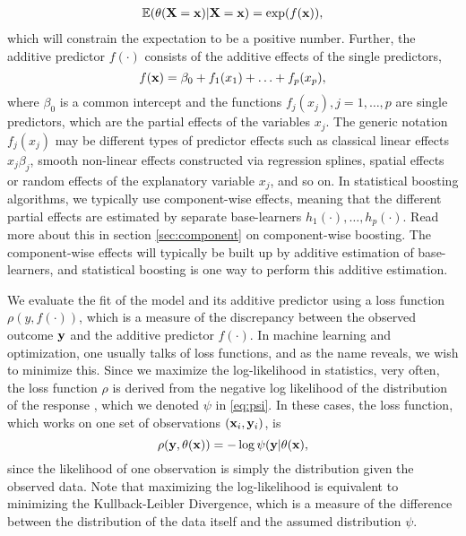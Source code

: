 \begin{align}
    \mathbb{E}(\theta(\mathbf{X}=\mathbf{x})|\mathbf{X}=\mathbf{x})=\exp(f(\mathbf{x})),
\end{align}
which will constrain the expectation to be a positive number. Further, the additive predictor $f(\cdot)$ consists of the additive effects of the single predictors,
\begin{equation}\label{eq:gam}
    f(\mathbf{x})=\beta_0+f_1(x_1)+\ldots+f_p(x_p),
\end{equation}
where $\beta_0$ is a common intercept and the functions $f_j(x_j),j=1,\ldots,p$ are single predictors, which are the partial effects of the variables $x_j$. The generic notation $f_j(x_j)$ may be different types of predictor effects such as classical linear effects $x_j\beta_j$, smooth non-linear effects constructed via regression splines, spatial effects or random effects of the explanatory variable $x_j$, and so on.
In statistical boosting algorithms, we typically use component-wise effects, meaning that the different partial effects are estimated by separate base-learners $h_1(\cdot),\ldots,h_p(\cdot)$. Read more about this in section \ref{sec:component} on component-wise boosting. The component-wise effects will typically be built up by additive estimation of base-learners, and statistical boosting is one way to perform this additive estimation.

We evaluate the fit of the model and its additive predictor using a loss function $\rho(y,f(\cdot))$, which is a measure of the discrepancy between the observed outcome $\mathbf{y}$ and the additive predictor $f(\cdot)$. In machine learning and optimization, one usually talks of loss functions, and as the name reveals, we wish to minimize this. Since we maximize the log-likelihood in statistics, very often, the loss function $\rho$ is derived from the negative log likelihood of the distribution of the response \citep{mayr14a, bovelstadborgan}, which we denoted $\psi$ in \eqref{eq:psi}. In these cases, the loss function, which works on one set of observations $(\mathbf{x}_i,\mathbf{y}_i)$, is
\begin{equation}
    \rho(\mathbf{y},\theta(\mathbf{x}))=-\log{\psi(\mathbf{y}|\theta(\mathbf{x})},
\end{equation}
since the likelihood of one observation is simply the distribution given the observed data. Note that maximizing the log-likelihood is equivalent to minimizing the Kullback-Leibler Divergence, which is a measure of the difference between the distribution of the data itself and the assumed distribution $\psi$. 

